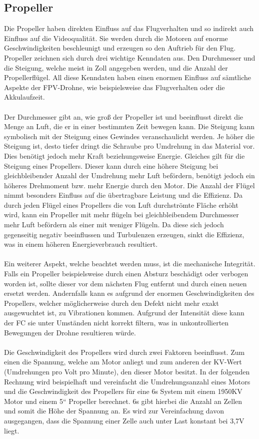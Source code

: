     \subsection[Propeller]{Propeller}
        Die Propeller haben direkten Einfluss auf das Flugverhalten und so indirekt auch Einfluss auf die Videoqualität. Sie werden durch die Motoren auf enorme Geschwindigkeiten beschleunigt und erzeugen so den Auftrieb für den Flug. Propeller zeichnen sich durch drei wichtige Kenndaten aus. Den Durchmesser und die Steigung, welche meist in Zoll angegeben werden, und die Anzahl der Propellerflügel. All diese Kenndaten haben einen enormen Einfluss auf sämtliche Aspekte der FPV-Drohne, wie beispielsweise das Flugverhalten oder die Akkulaufzeit.
        \\ \\
        Der Durchmesser gibt an, wie groß der Propeller ist und beeinflusst direkt die Menge an Luft, die er in einer bestimmten Zeit bewegen kann. Die Steigung kann symbolisch mit der Steigung eines Gewindes veranschaulicht werden. Je höher die Steigung ist, desto tiefer dringt die Schraube pro Umdrehung in das Material vor. Dies benötigt jedoch mehr Kraft beziehungsweise Energie. Gleiches gilt für die Steigung eines Propellers. Dieser kann durch eine höhere Steigung bei gleichbleibender Anzahl der Umdrehung mehr Luft befördern, benötigt jedoch ein höheres Drehmoment bzw. mehr Energie durch den Motor. Die Anzahl der Flügel nimmt besonders Einfluss auf die übertragbare Leistung und die Effizienz. Da durch jeden Flügel eines Propellers die von Luft durchströmte Fläche erhöht wird, kann ein Propeller mit mehr flügeln bei gleichbleibendem Durchmesser mehr Luft befördern als einer mit weniger Flügeln. Da diese sich jedoch gegenseitig negativ beeinflussen und Turbulenzen erzeugen, sinkt die Effizienz, was in einem höheren Energieverbrauch resultiert.
        \\ \\
        Ein weiterer Aspekt, welche beachtet werden muss, ist die mechanische Integrität. Falls ein Propeller beispielsweise durch einen Absturz beschädigt oder verbogen worden ist, sollte dieser vor dem nächsten Flug entfernt und durch einen neuen ersetzt werden. Andernfalls kann es aufgrund der enormen Geschwindigkeiten des Propellers, welcher möglicherweise durch den Defekt nicht mehr exakt ausgewuchtet ist, zu Vibrationen kommen. Aufgrund der Intensität diese kann der FC sie unter Umständen nicht korrekt filtern, was in unkontrollierten Bewegungen der Drohne resultieren würde.
        \\ \\
        Die Geschwindigkeit des Propellers wird durch zwei Faktoren beeinflusst. Zum einen die Spannung, welche am Motor anliegt und zum anderen der KV-Wert (Umdrehungen pro Volt pro Minute), den dieser Motor besitzt. In der folgenden Rechnung wird beispielhaft und vereinfacht die Umdrehungsanzahl eines Motors und die Geschwindigkeit des Propellers für eine 6s System mit einem 1950KV Motor und einem 5“ Propeller berechnet. 6s gibt hierbei die Anzahl an Zellen und somit die Höhe der Spannung an. Es wird zur Vereinfachung davon ausgegangen, dass die Spannung einer Zelle auch unter Last konstant bei 3,7V liegt.
    
